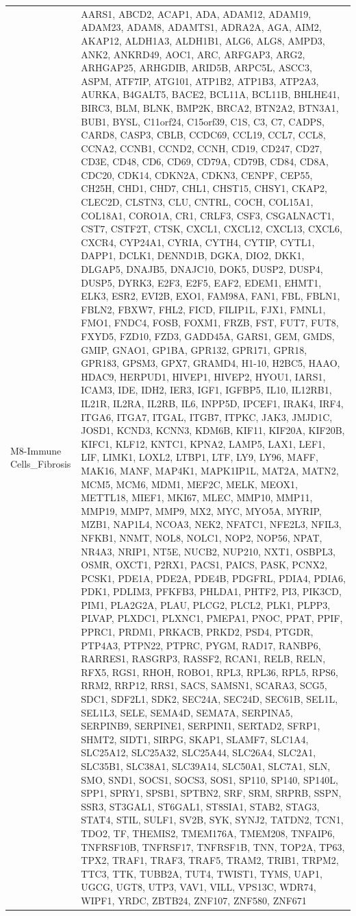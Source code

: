 \documentclass[
]{article}
\begin{document}
\begin{singlespace}
\begin{longtable}[t]{>{\raggedright\arraybackslash}p{1in}>{\raggedright\arraybackslash}p{5in}}
M8-Immune Cells\_Fibrosis & AARS1, ABCD2, ACAP1, ADA, ADAM12, ADAM19, ADAM23, ADAM8, ADAMTS1, ADRA2A, AGA, AIM2, AKAP12, ALDH1A3, ALDH1B1, ALG6, ALG8, AMPD3, ANK2, ANKRD49, AOC1, ARC, ARFGAP3, ARG2, ARHGAP25, ARHGDIB, ARID5B, ARPC5L, ASCC3, ASPM, ATF7IP, ATG101, ATP1B2, ATP1B3, ATP2A3, AURKA, B4GALT5, BACE2, BCL11A, BCL11B, BHLHE41, BIRC3, BLM, BLNK, BMP2K, BRCA2, BTN2A2, BTN3A1, BUB1, BYSL, C11orf24, C15orf39, C1S, C3, C7, CADPS, CARD8, CASP3, CBLB, CCDC69, CCL19, CCL7, CCL8, CCNA2, CCNB1, CCND2, CCNH, CD19, CD247, CD27, CD3E, CD48, CD6, CD69, CD79A, CD79B, CD84, CD8A, CDC20, CDK14, CDKN2A, CDKN3, CENPF, CEP55, CH25H, CHD1, CHD7, CHL1, CHST15, CHSY1, CKAP2, CLEC2D, CLSTN3, CLU, CNTRL, COCH, COL15A1, COL18A1, CORO1A, CR1, CRLF3, CSF3, CSGALNACT1, CST7, CSTF2T, CTSK, CXCL1, CXCL12, CXCL13, CXCL6, CXCR4, CYP24A1, CYRIA, CYTH4, CYTIP, CYTL1, DAPP1, DCLK1, DENND1B, DGKA, DIO2, DKK1, DLGAP5, DNAJB5, DNAJC10, DOK5, DUSP2, DUSP4, DUSP5, DYRK3, E2F3, E2F5, EAF2, EDEM1, EHMT1, ELK3, ESR2, EVI2B, EXO1, FAM98A, FAN1, FBL, FBLN1, FBLN2, FBXW7, FHL2, FICD, FILIP1L, FJX1, FMNL1, FMO1, FNDC4, FOSB, FOXM1, FRZB, FST, FUT7, FUT8, FXYD5, FZD10, FZD3, GADD45A, GARS1, GEM, GMDS, GMIP, GNAO1, GP1BA, GPR132, GPR171, GPR18, GPR183, GPSM3, GPX7, GRAMD4, H1-10, H2BC5, HAAO, HDAC9, HERPUD1, HIVEP1, HIVEP2, HYOU1, IARS1, ICAM3, IDE, IDH2, IER3, IGF1, IGFBP5, IL10, IL12RB1, IL21R, IL2RA, IL2RB, IL6, INPP5D, IPCEF1, IRAK4, IRF4, ITGA6, ITGA7, ITGAL, ITGB7, ITPKC, JAK3, JMJD1C, JOSD1, KCND3, KCNN3, KDM6B, KIF11, KIF20A, KIF20B, KIFC1, KLF12, KNTC1, KPNA2, LAMP5, LAX1, LEF1, LIF, LIMK1, LOXL2, LTBP1, LTF, LY9, LY96, MAFF, MAK16, MANF, MAP4K1, MAPK1IP1L, MAT2A, MATN2, MCM5, MCM6, MDM1, MEF2C, MELK, MEOX1, METTL18, MIEF1, MKI67, MLEC, MMP10, MMP11, MMP19, MMP7, MMP9, MX2, MYC, MYO5A, MYRIP, MZB1, NAP1L4, NCOA3, NEK2, NFATC1, NFE2L3, NFIL3, NFKB1, NNMT, NOL8, NOLC1, NOP2, NOP56, NPAT, NR4A3, NRIP1, NT5E, NUCB2, NUP210, NXT1, OSBPL3, OSMR, OXCT1, P2RX1, PACS1, PAICS, PASK, PCNX2, PCSK1, PDE1A, PDE2A, PDE4B, PDGFRL, PDIA4, PDIA6, PDK1, PDLIM3, PFKFB3, PHLDA1, PHTF2, PI3, PIK3CD, PIM1, PLA2G2A, PLAU, PLCG2, PLCL2, PLK1, PLPP3, PLVAP, PLXDC1, PLXNC1, PMEPA1, PNOC, PPAT, PPIF, PPRC1, PRDM1, PRKACB, PRKD2, PSD4, PTGDR, PTP4A3, PTPN22, PTPRC, PYGM, RAD17, RANBP6, RARRES1, RASGRP3, RASSF2, RCAN1, RELB, RELN, RFX5, RGS1, RHOH, ROBO1, RPL3, RPL36, RPL5, RPS6, RRM2, RRP12, RRS1, SACS, SAMSN1, SCARA3, SCG5, SDC1, SDF2L1, SDK2, SEC24A, SEC24D, SEC61B, SEL1L, SEL1L3, SELE, SEMA4D, SEMA7A, SERPINA5, SERPINB9, SERPINE1, SERPINI1, SERTAD2, SFRP1, SHMT2, SIDT1, SIRPG, SKAP1, SLAMF7, SLC1A4, SLC25A12, SLC25A32, SLC25A44, SLC26A4, SLC2A1, SLC35B1, SLC38A1, SLC39A14, SLC50A1, SLC7A1, SLN, SMO, SND1, SOCS1, SOCS3, SOS1, SP110, SP140, SP140L, SPP1, SPRY1, SPSB1, SPTBN2, SRF, SRM, SRPRB, SSPN, SSR3, ST3GAL1, ST6GAL1, ST8SIA1, STAB2, STAG3, STAT4, STIL, SULF1, SV2B, SYK, SYNJ2, TATDN2, TCN1, TDO2, TF, THEMIS2, TMEM176A, TMEM208, TNFAIP6, TNFRSF10B, TNFRSF17, TNFRSF1B, TNN, TOP2A, TP63, TPX2, TRAF1, TRAF3, TRAF5, TRAM2, TRIB1, TRPM2, TTC3, TTK, TUBB2A, TUT4, TWIST1, TYMS, UAP1, UGCG, UGT8, UTP3, VAV1, VILL, VPS13C, WDR74, WIPF1, YRDC, ZBTB24, ZNF107, ZNF580, ZNF671\\

\end{longtable}
\end{singlespace}
\end{document}
